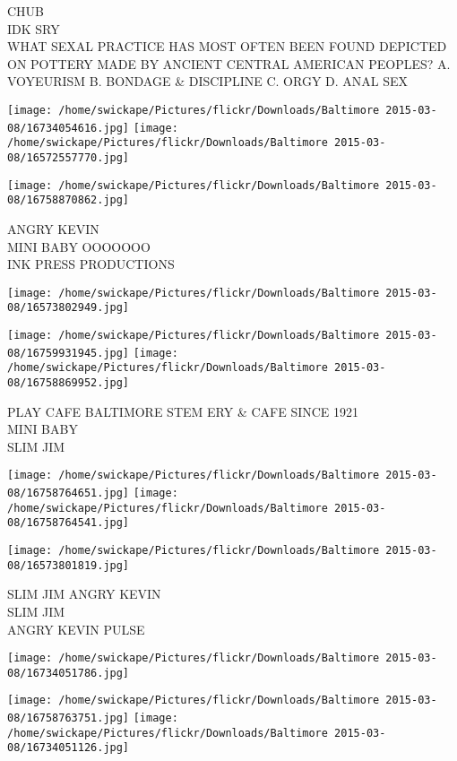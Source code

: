 \documentclass[10pt,letterpaper]{article}
\begin{document}
CHUB\\
IDK SRY\\
WHAT SEXAL PRACTICE HAS MOST OFTEN BEEN FOUND DEPICTED ON POTTERY MADE BY ANCIENT CENTRAL AMERICAN PEOPLES?  A. VOYEURISM B. BONDAGE \& DISCIPLINE C. ORGY D. ANAL SEX
\pagebreak

\texttt{[image: /home/swickape/Pictures/flickr/Downloads/Baltimore 2015-03-08/16734054616.jpg]}
\texttt{[image: /home/swickape/Pictures/flickr/Downloads/Baltimore 2015-03-08/16572557770.jpg]}

\texttt{[image: /home/swickape/Pictures/flickr/Downloads/Baltimore 2015-03-08/16758870862.jpg]}

ANGRY KEVIN\\
MINI BABY OOOOOOO\\
INK PRESS PRODUCTIONS
\pagebreak

\texttt{[image: /home/swickape/Pictures/flickr/Downloads/Baltimore 2015-03-08/16573802949.jpg]}

\vspace{0.25in}
\texttt{[image: /home/swickape/Pictures/flickr/Downloads/Baltimore 2015-03-08/16759931945.jpg]}
\texttt{[image: /home/swickape/Pictures/flickr/Downloads/Baltimore 2015-03-08/16758869952.jpg]}

PLAY CAFE BALTIMORE STEM ERY \& CAFE SINCE 1921\\
MINI BABY\\
SLIM JIM
\pagebreak

\texttt{[image: /home/swickape/Pictures/flickr/Downloads/Baltimore 2015-03-08/16758764651.jpg]}
\texttt{[image: /home/swickape/Pictures/flickr/Downloads/Baltimore 2015-03-08/16758764541.jpg]}

\texttt{[image: /home/swickape/Pictures/flickr/Downloads/Baltimore 2015-03-08/16573801819.jpg]}

SLIM JIM ANGRY KEVIN\\
SLIM JIM\\
ANGRY KEVIN PULSE
\pagebreak

\texttt{[image: /home/swickape/Pictures/flickr/Downloads/Baltimore 2015-03-08/16734051786.jpg]}

\vspace{0.25in}
\texttt{[image: /home/swickape/Pictures/flickr/Downloads/Baltimore 2015-03-08/16758763751.jpg]}
\texttt{[image: /home/swickape/Pictures/flickr/Downloads/Baltimore 2015-03-08/16734051126.jpg]}
\end{document}
